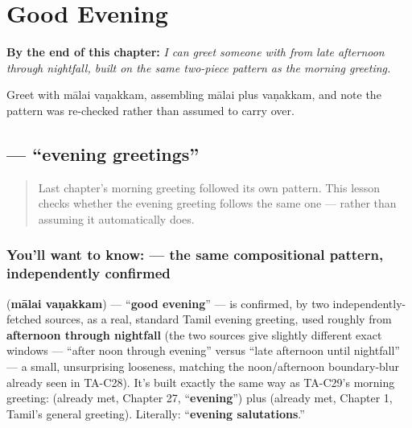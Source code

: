 
\chapter{Good Evening}
\label{ch:ta-good-evening}

\begin{chapteropening}
\textbf{By the end of this chapter:} \emph{I can greet someone with   from late afternoon through nightfall, built on the same two-piece pattern as the morning greeting.}

Greet with mālai vaṇakkam, assembling mālai plus vaṇakkam, and note the pattern was re-checked rather than assumed to carry over.
\end{chapteropening}

\section[\texorpdfstring{\ta{மாலை} \ta{வணக்கம்} (mālai vaṇakkam)}{மாலை வணக்கம் (mālai vaṇakkam)}]{  — \textquotedblleft{}evening greetings\textquotedblright{}}

\label{lesson:TA-C30-maalai-vanakkam}



\begin{quote}
Last chapter's morning greeting followed its own pattern. This lesson checks whether the evening greeting follows the same one — rather than assuming it automatically does.
\end{quote}

\subsection*{You'll want to know:   — the same compositional pattern, independently confirmed}
\textbf{ } (\textbf{mālai vaṇakkam}) — \textquotedblleft{}\textbf{good evening}\textquotedblright{} — is confirmed, by two independently-fetched sources, as a real, standard Tamil evening greeting, used roughly from \textbf{afternoon through nightfall} (the two sources give slightly different exact windows — \textquotedblleft{}after noon through evening\textquotedblright{} versus \textquotedblleft{}late afternoon until nightfall\textquotedblright{} — a small, unsurprising looseness, matching the noon/afternoon boundary-blur already seen in TA-C28). It's built exactly the same way as TA-C29's morning greeting: \textbf{} (already met, Chapter 27, \textquotedblleft{}\textbf{evening}\textquotedblright{}) plus \textbf{} (already met, Chapter 1, Tamil's general greeting). Literally: \textquotedblleft{}\textbf{evening salutations}.\textquotedblright{}


